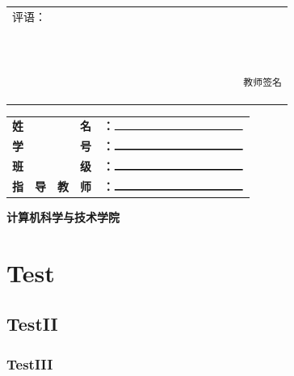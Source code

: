 \documentclass{article}
\begin{document}
        \begin{center}
            \xiaosihao
            \begin{tabular}{|p{\linewidth}|}
                \hline
                评语：\\
                \\
                \\
                \\
                \\
                \\
                \\
                \\
                \\
                {
                    \begin{verbatim}
                                        教师签名
                    \end{verbatim}
                }\\
                \hline
            \end{tabular}
        \end{center}
        \begin{center}
            \begin{SignPlace}
                \begin{tabular}{ccccc}
                    \textbf{姓} & & & \textbf{名}&\textbf{：}$\rule{4cm}{0.30mm}$\\
                    \textbf{学} & & & \textbf{号}&\textbf{：}$\rule{4cm}{0.30mm}$\\
                    \textbf{班} & & & \textbf{级}&\textbf{：}$\rule{4cm}{0.30mm}$\\
                    \textbf{指}&\textbf{导}&\textbf{教}&\textbf{师}&\textbf{：}$\rule{4cm}{0.30mm}$\\
                \end{tabular}
            \end{SignPlace}
        \end{center}
        \begin{center}
            \begin{SignPlace}
                \textbf{计算机科学与技术学院}
            \end{SignPlace}
        \end{center}
        \newpage
        \pagestyle{ContentPage}
        \section{Test}
        \subsection{TestII}
        \subsubsection{TestIII}
        \newpage
        \begin{appendix}
            \listoffigures
            \listoftables
        \end{appendix}
    
\end{document}
